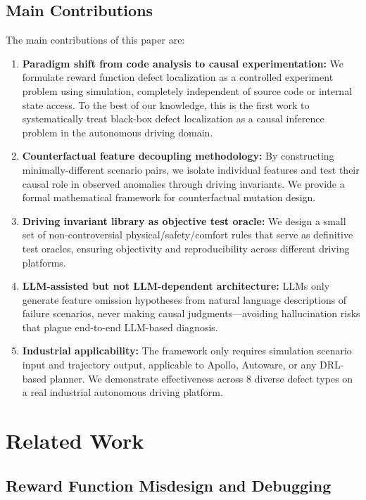 \documentclass[conference]{IEEEtran}
\theoremstyle{plain}
\begin{document}
\subsection{Main Contributions}

The main contributions of this paper are:

\begin{enumerate}
    \item \textbf{Paradigm shift from code analysis to causal experimentation:} We formulate reward function defect localization as a controlled experiment problem using simulation, completely independent of source code or internal state access. To the best of our knowledge, this is the first work to systematically treat black-box defect localization as a causal inference problem in the autonomous driving domain.
    \item \textbf{Counterfactual feature decoupling methodology:} By constructing minimally-different scenario pairs, we isolate individual features and test their causal role in observed anomalies through driving invariants. We provide a formal mathematical framework for counterfactual mutation design.
    \item \textbf{Driving invariant library as objective test oracle:} We design a small set of non-controversial physical/safety/comfort rules that serve as definitive test oracles, ensuring objectivity and reproducibility across different driving platforms.
    \item \textbf{LLM-assisted but not LLM-dependent architecture:} LLMs only generate feature omission hypotheses from natural language descriptions of failure scenarios, never making causal judgments---avoiding hallucination risks that plague end-to-end LLM-based diagnosis.
    \item \textbf{Industrial applicability:} The framework only requires simulation scenario input and trajectory output, applicable to Apollo, Autoware, or any DRL-based planner. We demonstrate effectiveness across 8 diverse defect types on a real industrial autonomous driving platform.
\end{enumerate}

\section{Related Work}
\label{sec:related}

\subsection{Reward Function Misdesign and Debugging}
\end{document}
